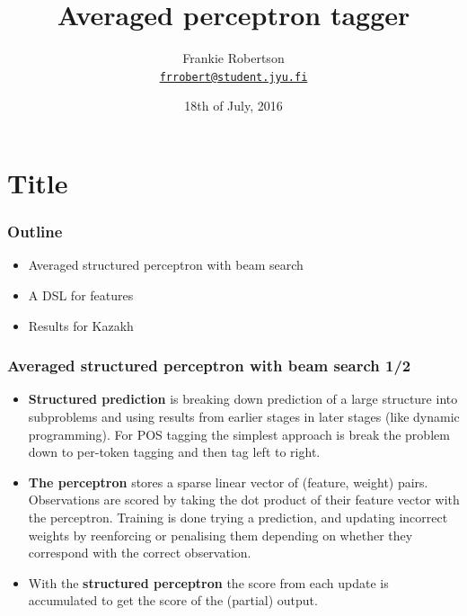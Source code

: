 \documentclass{beamer}
\title[POS tagger internals]{Averaged perceptron tagger}
\institute[JYU]{University of Jyväskylä\\
\vspace{5mm}
\url{https://www.github.com/frankier/perceptron-tagger-slides/}}
\author[Frankie Robertson]{Frankie Robertson\texorpdfstring{\\
\href{mailto:frrobert@student.jyu.fi}{\texttt{frrobert@student.jyu.fi}}}{}}
\date{18th of July, 2016}
\begin{document}
\section{Title}
\begin{frame}
  \titlepage{}
\end{frame}

\begin{frame}
\frametitle{Outline}
\begin{itemize}

  \item Averaged structured perceptron with beam search

  \item A DSL for features

  \item Results for Kazakh

\end{itemize}
\end{frame}

\begin{frame}
\frametitle{Averaged structured perceptron with beam search 1/2}
\begin{itemize}

  \item \textbf{Structured prediction} is breaking down prediction of a large
    structure into subproblems and using results from earlier stages in later
    stages (like dynamic programming). For POS tagging the simplest approach is
    break the problem down to per-token tagging and then tag left to right.

  \item \textbf{The perceptron} stores a sparse linear vector of (feature,
    weight) pairs.  Observations are scored by taking the dot product of their
    feature vector with the perceptron. Training is done trying a prediction,
    and updating incorrect weights by reenforcing or penalising them depending
    on whether they correspond with the correct observation.

  \item With the \textbf{structured perceptron} the score from each update is
    accumulated to get the score of the (partial) output.

\end{itemize}
\end{frame}
\end{document}
